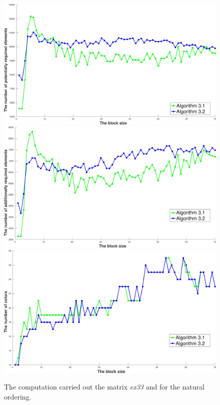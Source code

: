 \documentclass[12pt, twoside,a4paper,toc=bibliography]{scrbook}
\begin{document}
\begin{figure}
\centering
\includegraphics[width=0.75\linewidth]{ex33_alg31_alg32_bls_lfo_pot}
\includegraphics[width=0.75\linewidth]{ex33_alg31_alg32_bls_lfo_add}
\includegraphics[width=0.75\linewidth]{ex33_alg31_alg32_bls_lfo_cols}
\caption{The computation carried  out the matrix \textit{ex33} and for the natural ordering.}
\label{ex33_alg31_alg32_bls_lfo}
\end{figure}
\end{document}
